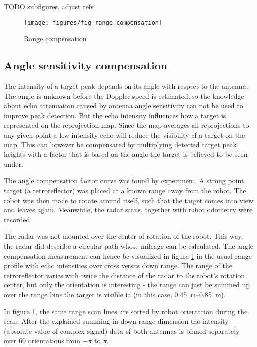 TODO subfigures, adjust refs
\begin{figure}[htbp]
    \centering
    \texttt{[image: figures/fig\_range\_compensation]}
    \caption{Range compensation}
    \label{fig:fig_range_compensation}
\end{figure}

\subsection{Angle sensitivity compensation}\label{angle-sensitivity-compensation}

The intensity of a target peak depends on its angle with respect to the
antenna. The angle is unknown before the Doppler speed is estimated, so
the knowledge about echo attenuation caused by antenna angle sensitivity
can not be used to improve peak detection. But the echo intensity
influences how a target is represented on the reprojection map. Since
the map averages all reprojections to any given point a low intensity
echo will reduce the visibility of a target on the map. This can however
be compensated by multiplying detected target peak heights with a factor
that is based on the angle the target is believed to be seen under.

The angle compensation factor curve was found by experiment. A strong
point target (a retroreflector) was placed at a known range away from
the robot. The robot was then made to rotate around itself, such that
the target comes into view and leaves again. Meanwhile, the radar scans,
together with robot odometry were recorded.

The radar was not mounted over the center of rotation of the robot. This
way, the radar did describe a circular path whose mileage can be
calculated. The angle compensation measurement can hence be visualized
in figure \cref{fig:fig_range_compensation} in the usual range profile with echo intensities over
cross versus down range. The range of the retroreflector varies with
twice the distance of the radar to the robot's rotation center, but only
the orientation is interesting - the range can just be summed up over
the range bins the target is visible in (in this case,
\SIrange{0.45}{0.85}{m}).

In figure \cref{fig:fig_range_compensation}, the same range scan lines are sorted by robot
orientation during the scan. After the explained summing in down range
dimension the intensity (absolute value of complex signal) data of both
antennas is binned separately over 60 orientations from \(-\pi\) to
\(\pi\).

